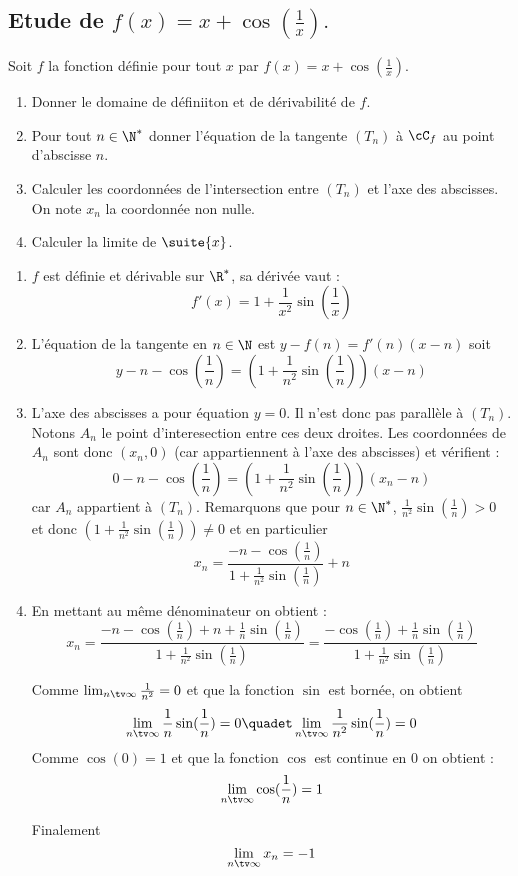 \subsection{Etude de $f(x) = x+\cos\left(\frac{1}{x}\right).$}


\begin{exercice}
Soit $f$ la fonction définie pour tout $x$ par $f(x) = x+\cos\left(\frac{1}{x}\right).$
\begin{enumerate}
\item Donner le domaine de définiiton et de dérivabilité de $f$. 
\item Pour tout $n\in\N^* $ donner l'équation de la tangente 
$(T_n)$ à $\cC_f$ au point d'abscisse $n$. 
\item Calculer les coordonnées de  l'intersection entre $(T_n)$ et l'axe des abscisses. On note $x_n$ la coordonnée non nulle. 
\item Calculer la limite de $\suite{x}$. 
\end{enumerate}
\end{exercice}

\begin{correction}
\begin{enumerate}
\item $f$ est définie et dérivable sur $\R^*$, sa dérivée vaut :
$$f'(x) = 1 + \frac{1}{x^2}\sin(\frac{1}{x})$$
\item L'équation de la tangente en $n\in \N$ est 
$ y- f(n) = f'(n) (x-n)$
soit 
$$y -n -\cos(\frac{1}{n}) = ( 1 + \frac{1}{n^2}\sin(\frac{1}{n}))(x-n)$$
\item L'axe des abscisses a pour équation $y=0$. Il n'est donc pas parallèle à $(T_n)$. Notons $A_n$ le point d'interesection entre ces deux droites. 
Les coordonnées de $A_n$ sont donc $(x_n,0)$ (car appartiennent à l'axe des abscisses) et vérifient : 
$$  0-n -\cos(\frac{1}{n}) = ( 1 + \frac{1}{n^2}\sin(\frac{1}{n}))(x_n-n)$$
car $A_n$ appartient à $(T_n)$. Remarquons que pour $n\in \N^*$, $\frac{1}{n^2}\sin(\frac{1}{n})>0 $ et donc $( 1 + \frac{1}{n^2}\sin(\frac{1}{n})) \neq 0$ et en particulier $$x_n =  \frac{-n -\cos(\frac{1}{n})}{ 1 + \frac{1}{n^2}\sin(\frac{1}{n}) }+n$$

\item En mettant au même dénominateur on obtient : 
$$x_n = \frac{-n -\cos(\frac{1}{n}) +n +\frac{1}{n}\sin(\frac{1}{n})}{ 1 + \frac{1}{n^2}\sin(\frac{1}{n}) }=\frac{ -\cos(\frac{1}{n}) +\frac{1}{n}\sin(\frac{1}{n})}{ 1 + \frac{1}{n^2}\sin(\frac{1}{n}) } $$

Comme $ \lim_{n\tv \infty} \frac{1}{n^2} = 0$ et que la fonction $\sin$  est bornée, on obtient 
$$ \lim_{n\tv \infty} \frac{1}{n}\sin(\frac{1}{n})=0\quadet \lim_{n\tv \infty}  \frac{1}{n^2}\sin(\frac{1}{n})= 0$$
Comme $\cos(0)=1$ et que la fonction $\cos$ est continue en $0$ on obtient : 
$$  \lim_{n\tv \infty} \cos(\frac{1}{n}) = 1$$

Finalement $$ \lim_{n\tv \infty} x_n =-1$$


\end{enumerate}
\end{correction}